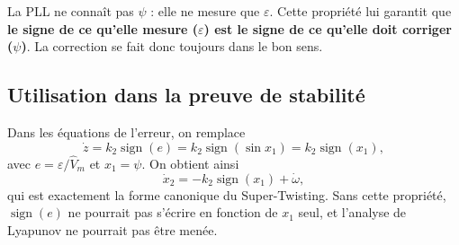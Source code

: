 \documentclass[11pt,a4paper]{article}
\numberwithin{equation}{section}
\theoremstyle{plain}
\theoremstyle{definition}
\newcommand{\sign}{\operatorname{sign}}
\begin{document}
\begin{idee}
La PLL ne connaît pas $\psi$ : elle ne mesure que $\varepsilon$. Cette propriété lui garantit que
\textbf{le signe de ce qu'elle mesure ($\varepsilon$) est le signe de ce qu'elle doit corriger ($\psi$)}.
La correction se fait donc toujours dans le bon sens.
\end{idee}

\subsection*{Utilisation dans la preuve de stabilité}
Dans les équations de l'erreur, on remplace
\begin{equation}
\dot z = k_2\sign(e) = k_2\sign(\sin x_1) = k_2\sign(x_1),
\end{equation}
avec $e = \varepsilon/\hat V_m$ et $x_1=\psi$. On obtient ainsi
\begin{equation}
\dot x_2 = -k_2\sign(x_1)+\dot\omega ,
\end{equation}
qui est exactement la forme canonique du Super-Twisting. Sans cette propriété, $\sign(e)$ ne pourrait pas
s'écrire en fonction de $x_1$ seul, et l'analyse de Lyapunov ne pourrait pas être menée.
\end{document}
